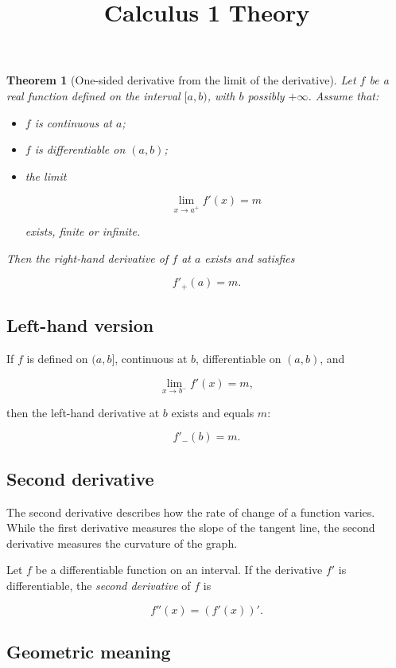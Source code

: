 \documentclass[11pt,a4paper]{article} \usepackage[T1]{fontenc}
\theoremstyle{plain} \newtheorem{theorem}{Theorem} \title{Calculus 1 Theory}
\begin{document}
\begin{theorem}
[One-sided derivative from the limit of the derivative] Let $f$ be a real
function defined on the interval $[a,b)$, with $b$ possibly $+\infty$. Assume
that:

\begin{itemize}
\item $f$ is continuous at $a$;
\item $f$ is differentiable on $(a,b)$;
\item the limit

\[
\lim_{x\to a^+} f'(x) = m
\]

exists, finite or infinite.
\end{itemize}

Then the right-hand derivative of $f$ at $a$ exists and satisfies

\[
f'_+(a) = m.
\]

\end{theorem}

\subsection*{Left-hand version}

If $f$ is defined on $(a,b]$, continuous at $b$, differentiable on $(a,b)$, and

\[
\lim_{x\to b^-} f'(x) = m,
\]

then the left-hand derivative at $b$ exists and equals $m$:

\[
f'_-(b) = m.
\]

\subsection {Second derivative}

The second derivative describes how the rate of change of a function varies.
While the first derivative measures the slope of the tangent line, the second
derivative measures the curvature of the graph.

\begin{definition}
 Let $f$ be a differentiable function on an interval. If the
derivative $f'$ is differentiable, the \emph{second derivative} of $f$ is

\[
f''(x) = (f'(x))'.
\]

\end{definition}

\subsection*{Geometric meaning}
\end{document}
